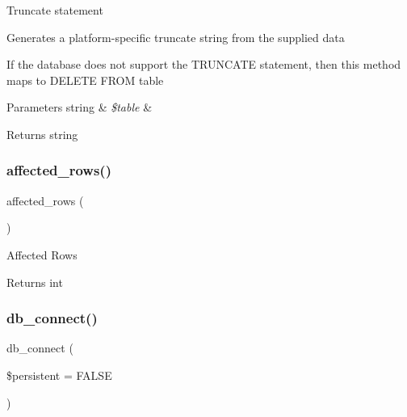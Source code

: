 Truncate statement

Generates a platform-\/specific truncate string from the supplied data

If the database does not support the T\+R\+U\+N\+C\+A\+TE statement, then this method maps to \textquotesingle{}D\+E\+L\+E\+TE F\+R\+OM table\textquotesingle{}


\begin{DoxyParams}[1]{Parameters}
string & {\em \$table} & \\
\hline
\end{DoxyParams}
\begin{DoxyReturn}{Returns}
string 
\end{DoxyReturn}
\mbox{\label{class_c_i___d_b__sqlite3__driver_a77248aaad33eb132c04cc4aa3f4bc8cb}} 
\subsubsection{\texorpdfstring{affected\+\_\+rows()}{affected\_rows()}}
{\footnotesize\ttfamily affected\+\_\+rows (\begin{DoxyParamCaption}{ }\end{DoxyParamCaption})}

Affected Rows

\begin{DoxyReturn}{Returns}
int 
\end{DoxyReturn}
\mbox{\label{class_c_i___d_b__sqlite3__driver_a52bf595e79e96cc0a7c907a9b45aeb4d}} 
\subsubsection{\texorpdfstring{db\+\_\+connect()}{db\_connect()}}
{\footnotesize\ttfamily db\+\_\+connect (\begin{DoxyParamCaption}\item[{}]{\$persistent = {\ttfamily FALSE} }\end{DoxyParamCaption})}

